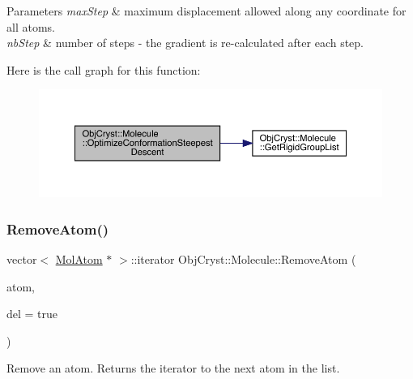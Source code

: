 \begin{DoxyParams}{Parameters}
{\em max\+Step} & maximum displacement allowed along any coordinate for all atoms. \\
\hline
{\em nb\+Step} & number of steps -\/ the gradient is re-\/calculated after each step. \\
\hline
\end{DoxyParams}
Here is the call graph for this function\+:
\nopagebreak
\begin{figure}[H]
\begin{center}
\leavevmode
\includegraphics[width=350pt]{class_obj_cryst_1_1_molecule_ac275665ed11daea220ef37154b39bf0d_cgraph}
\end{center}
\end{figure}
\mbox{\label{class_obj_cryst_1_1_molecule_a66bbf57cc85b1f5930b922edc3286fae}} 
\subsubsection{\texorpdfstring{RemoveAtom()}{RemoveAtom()}}
{\footnotesize\ttfamily vector$<$ \mbox{\hyperlink{class_obj_cryst_1_1_mol_atom}{Mol\+Atom}} $\ast$ $>$\+::iterator Obj\+Cryst\+::\+Molecule\+::\+Remove\+Atom (\begin{DoxyParamCaption}\item[{\mbox{\hyperlink{class_obj_cryst_1_1_mol_atom}{Mol\+Atom}} \&}]{atom,  }\item[{const bool}]{del = {\ttfamily true} }\end{DoxyParamCaption})}

Remove an atom. Returns the iterator to the next atom in the list.

